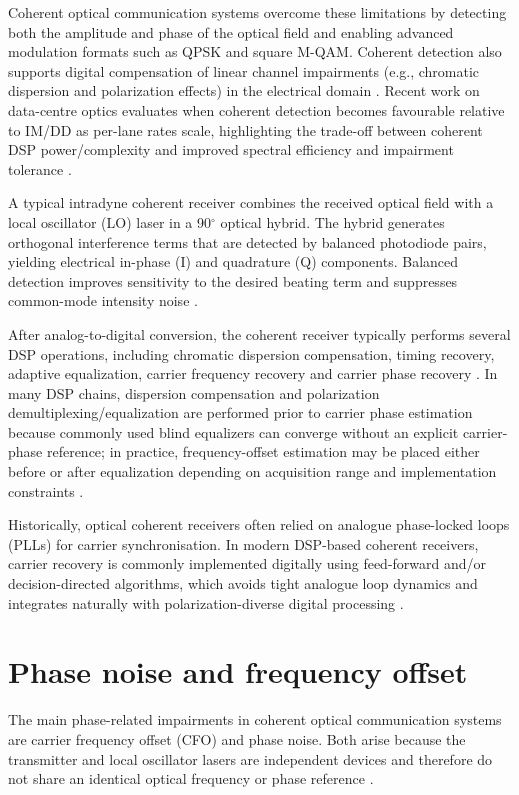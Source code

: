 Coherent optical communication systems overcome these limitations by detecting both the
amplitude and phase of the optical field and enabling advanced modulation formats such as
QPSK and square M-QAM. Coherent detection also supports digital compensation of linear
channel impairments (e.g., chromatic dispersion and polarization effects) in the electrical
domain \cite{KahnHo2004JSTQE,Savory2010JSTQE,Kuschnerov2009JLT}. Recent work on data-centre
optics evaluates when coherent detection becomes favourable relative to IM/DD as per-lane
rates scale, highlighting the trade-off between coherent DSP power/complexity and improved
spectral efficiency and impairment tolerance \cite{Zhou2020JLT}.

A typical intradyne coherent receiver combines the received optical field with a local
oscillator (LO) laser in a 90$^\circ$ optical hybrid. The hybrid generates orthogonal
interference terms that are detected by balanced photodiode pairs, yielding electrical
in-phase (I) and quadrature (Q) components. Balanced detection improves sensitivity to the
desired beating term and suppresses common-mode intensity noise \cite{Savory2010JSTQE,Kikuchi2016JLT}.

After analog-to-digital conversion, the coherent receiver typically performs several DSP
operations, including chromatic dispersion compensation, timing recovery, adaptive
equalization, carrier frequency recovery and carrier phase recovery \cite{Savory2010JSTQE,Kuschnerov2009JLT}.
In many DSP chains, dispersion compensation and polarization demultiplexing/equalization
are performed prior to carrier phase estimation because commonly used blind equalizers can
converge without an explicit carrier-phase reference; in practice, frequency-offset
estimation may be placed either before or after equalization depending on acquisition range
and implementation constraints \cite{Savory2010JSTQE,Kuschnerov2009JLT}.

Historically, optical coherent receivers often relied on analogue phase-locked loops (PLLs)
for carrier synchronisation. In modern DSP-based coherent receivers, carrier recovery is
commonly implemented digitally using feed-forward and/or decision-directed algorithms,
which avoids tight analogue loop dynamics and integrates naturally with polarization-diverse
digital processing \cite{Savory2010JSTQE,IpKahn2007JLT,Pfau2009JLT}.

\section{Phase noise and frequency offset}\label{phase noise and frequency offset}
The main phase-related impairments in coherent optical communication systems are carrier
frequency offset (CFO) and phase noise. Both arise because the transmitter and local
oscillator lasers are independent devices and therefore do not share an identical optical
frequency or phase reference \cite{Kikuchi2016JLT}.

